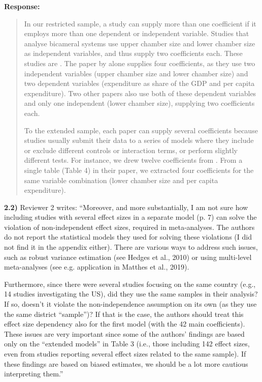 \documentclass[a4paper,12pt]{article}
\begin{document}
\noindent \textbf{Response:} 
\begin{quote}
    In our restricted sample, a study can supply more than one coefficient if it employs more than one dependent or independent variable. Studies that analyse bicameral systems use upper chamber size and lower chamber size as independent variables, and thus supply two coefficients each. These studies are \citet{chen2007law, crowley2019law, gilligan2001fiscal, lee2015supermajority, lee2016supermajority, lee2018court, maldonado2013legislatures, ricciuti2003trading, ricciuti2004legislatures, primo2006stop}. The paper by \citet{bradbury2001legislative} alone supplies four coefficients, as they use two independent variables (upper chamber size and lower chamber size) and two dependent variables (expenditure as share of the GDP and per capita expenditure). Two other papers \citep{bjedov2014impact, erler2007termlimits} also use both of these dependent variables and only one independent (lower chamber size), supplying two coefficients each.
    
    To the extended sample, each paper can supply several coefficients because studies usually submit their data to a series of models where they include or exclude different controls or interaction terms, or perform slightly different tests. For instance, we drew twelve coefficients from \citet{fiorino2007legislature}. From a single table (Table 4) in their paper, we extracted four coefficients for the same variable combination (lower chamber size and per capita expenditure).
\end{quote}

\vspace{.3cm}

\noindent \textbf{2.2)} Reviewer 2 writes: ``Moreover, and more substantially, I am not sure how including studies with several effect sizes in a separate model (p. 7) can solve the violation of non-independent effect sizes, required in meta-analyses. The authors do not report the statistical models they used for solving these violations (I did not find it in the appendix either). There are various ways to address such issues, such as robust variance estimation (see Hedges et al., 2010) or using multi-level meta-analyses (see e.g. application in Matthes et al., 2019). 

Furthermore, since there were several studies focusing on the same country (e.g., 14 studies investigating the US), did they use the same samples in their analysis? If so, doesn't it violate the non-independence assumption on its own (as they use the same district ``sample'')? If that is the case, the authors should treat this effect size dependency also for the first model (with the 42 main coefficients). These issues are very important since some of the authors' findings are based only on the ``extended models'' in Table 3 (i.e., those including 142 effect sizes, even from studies reporting several effect sizes related to the same sample). If these findings are based on biased estimates, we should be a lot more cautious interpreting them.''
\end{document}
